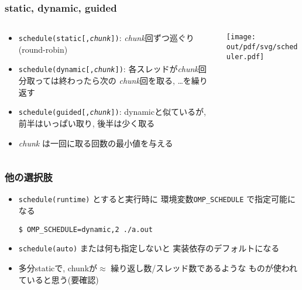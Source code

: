 \documentclass[10pt,dvipdfmx]{beamer}
\newcommand{\ao}[1]{{\color{blue}#1}}
\begin{document}
\begin{frame}
\frametitle{static, dynamic, guided}
\begin{columns}
  \begin{column}{0.53\textwidth}
\begin{itemize}
\item {\tt schedule(\ao{static{\rm [,{\em chunk}]}})}: 
  {\em chunk}回ずつ巡ぐり(round-robin)
\item {\tt schedule(\ao{dynamic{\rm [,{\em chunk}]}})}:
  各スレッドが{\em chunk}回分取っては終わったら次の
  {\em chunk}回を取る, \ldots を繰り返す
\item {\tt schedule(\ao{guided{\rm [,{\em chunk}]}})}:
  dynamicと似ているが, 前半はいっぱい取り, 後半は少く取る

\item \ao{\em chunk} は一回に取る回数の最小値を与える
\end{itemize}
  \end{column}

  \begin{column}{0.47\textwidth}
\texttt{[image: out/pdf/svg/scheduler.pdf]}
  \end{column}
\end{columns}
\end{frame}

\begin{frame}[fragile]
\frametitle{他の選択肢}
\begin{itemize}
\item {\tt schedule(\ao{runtime})} とすると実行時に
  環境変数{\tt OMP\_SCHEDULE} で指定可能になる
\begin{lstlisting}
$ OMP_SCHEDULE=dynamic,2 ./a.out
\end{lstlisting} %

\item {\tt schedule(\ao{auto})} または何も指定しないと
  実装依存のデフォルトになる

\item 多分staticで, chunkが$\approx$ 繰り返し数/スレッド数であるような
  ものが使われていると思う(要確認)


\end{itemize}
\end{frame}
\end{document}
